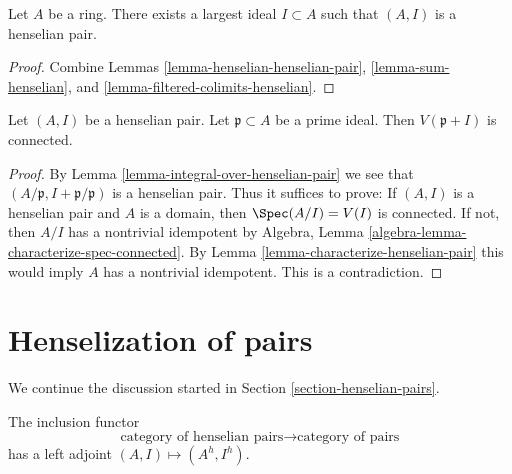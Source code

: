 \begin{lemma}
\label{lemma-largest-ideal-henselian}
Let $A$ be a ring. There exists a largest ideal $I \subset A$ such that
$(A, I)$ is a henselian pair.
\end{lemma}

\begin{proof}
Combine Lemmas \ref{lemma-henselian-henselian-pair}, \ref{lemma-sum-henselian},
and \ref{lemma-filtered-colimits-henselian}.
\end{proof}

\begin{lemma}
\label{lemma-irreducible-henselian-pair-connected}
Let $(A, I)$ be a henselian pair. Let $\mathfrak p \subset A$
be a prime ideal. Then $V(\mathfrak p + I)$ is connected.
\end{lemma}

\begin{proof}
By Lemma \ref{lemma-integral-over-henselian-pair} we see that
$(A/\mathfrak p, I + \mathfrak p/\mathfrak p)$ is a henselian pair.
Thus it suffices to prove: If $(A, I)$ is a henselian pair and
$A$ is a domain, then $\Spec(A/I) = V(I)$ is connected. If not,
then $A/I$ has a nontrivial idempotent by
Algebra, Lemma \ref{algebra-lemma-characterize-spec-connected}.
By Lemma \ref{lemma-characterize-henselian-pair}
this would imply $A$ has a nontrivial idempotent. This is a contradiction.
\end{proof}









\section{Henselization of pairs}
\label{section-henselization}

\noindent
We continue the discussion started in
Section \ref{section-henselian-pairs}.

\begin{lemma}
\label{lemma-henselization}
The inclusion functor
$$
\text{category of henselian pairs}
\longrightarrow
\text{category of pairs}
$$
has a left adjoint $(A, I) \mapsto (A^h, I^h)$.
\end{lemma}

